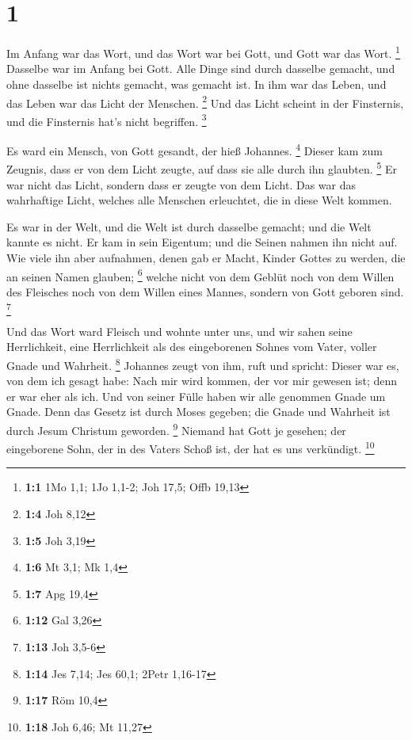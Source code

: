 \hypertarget{section}{%
\section{1}\label{section}}

 Im Anfang war das Wort, und das Wort war bei Gott, und
Gott war das Wort. \footnote{\textbf{1:1} 1Mo 1,1; 1Jo 1,1-2; Joh 17,5;
  Offb 19,13}  Dasselbe war im Anfang bei Gott.
 Alle Dinge sind durch dasselbe gemacht, und ohne dasselbe
ist nichts gemacht, was gemacht ist.  In ihm war das
Leben, und das Leben war das Licht der Menschen. \footnote{\textbf{1:4}
  Joh 8,12}  Und das Licht scheint in der Finsternis, und
die Finsternis hat's nicht begriffen. \footnote{\textbf{1:5} Joh 3,19}

 Es ward ein Mensch, von Gott gesandt, der hieß Johannes.
\footnote{\textbf{1:6} Mt 3,1; Mk 1,4}  Dieser kam zum
Zeugnis, dass er von dem Licht zeugte, auf dass sie alle durch ihn
glaubten. \footnote{\textbf{1:7} Apg 19,4}  Er war nicht
das Licht, sondern dass er zeugte von dem Licht.  Das war
das wahrhaftige Licht, welches alle Menschen erleuchtet, die in diese
Welt kommen.

 Es war in der Welt, und die Welt ist durch dasselbe
gemacht; und die Welt kannte es nicht.  Er kam in sein
Eigentum; und die Seinen nahmen ihn nicht auf.  Wie viele
ihn aber aufnahmen, denen gab er Macht, Kinder Gottes zu werden, die an
seinen Namen glauben; \footnote{\textbf{1:12} Gal 3,26} 
welche nicht von dem Geblüt noch von dem Willen des Fleisches noch von
dem Willen eines Mannes, sondern von Gott geboren sind. \footnote{\textbf{1:13}
  Joh 3,5-6}

 Und das Wort ward Fleisch und wohnte unter uns, und wir
sahen seine Herrlichkeit, eine Herrlichkeit als des eingeborenen Sohnes
vom Vater, voller Gnade und Wahrheit. \footnote{\textbf{1:14} Jes 7,14;
  Jes 60,1; 2Petr 1,16-17}  Johannes zeugt von ihm, ruft
und spricht: Dieser war es, von dem ich gesagt habe: Nach mir wird
kommen, der vor mir gewesen ist; denn er war eher als ich.
 Und von seiner Fülle haben wir alle genommen Gnade um
Gnade.  Denn das Gesetz ist durch Moses gegeben; die
Gnade und Wahrheit ist durch Jesum Christum geworden. \footnote{\textbf{1:17}
  Röm 10,4}  Niemand hat Gott je gesehen; der eingeborene
Sohn, der in des Vaters Schoß ist, der hat es uns verkündigt.
\footnote{\textbf{1:18} Joh 6,46; Mt 11,27}

